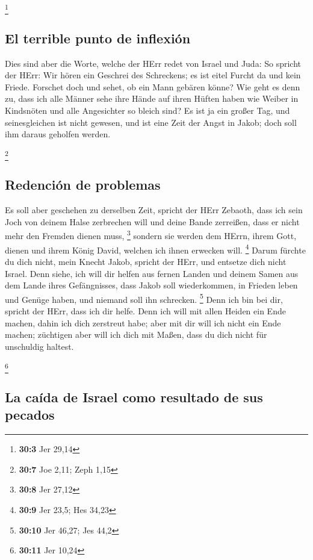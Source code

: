 \footnote{\textbf{30:3} Jer 29,14}

\hypertarget{el-terrible-punto-de-inflexiuxf3n}{%
\subsection{El terrible punto de
inflexión}\label{el-terrible-punto-de-inflexiuxf3n}}

 Dies sind aber die Worte, welche der HErr redet von
Israel und Juda:  So spricht der HErr: Wir hören ein
Geschrei des Schreckens; es ist eitel Furcht da und kein Friede.
 Forschet doch und sehet, ob ein Mann gebären könne? Wie
geht es denn zu, dass ich alle Männer sehe ihre Hände auf ihren Hüften
haben wie Weiber in Kindsnöten und alle Angesichter so bleich sind?
 Es ist ja ein großer Tag, und seinesgleichen ist nicht
gewesen, und ist eine Zeit der Angst in Jakob; doch soll ihm daraus
geholfen werden.

\footnote{\textbf{30:7} Joe 2,11; Zeph 1,15}

\hypertarget{redenciuxf3n-de-problemas}{%
\subsection{Redención de problemas}\label{redenciuxf3n-de-problemas}}

 Es soll aber geschehen zu derselben Zeit, spricht der
HErr Zebaoth, dass ich sein Joch von deinem Halse zerbrechen will und
deine Bande zerreißen, dass er nicht mehr den Fremden dienen muss,
\footnote{\textbf{30:8} Jer 27,12}  sondern sie werden dem
HErrn, ihrem Gott, dienen und ihrem König David, welchen ich ihnen
erwecken will. \footnote{\textbf{30:9} Jer 23,5; Hes 34,23}
 Darum fürchte du dich nicht, mein Knecht Jakob, spricht
der HErr, und entsetze dich nicht Israel. Denn siehe, ich will dir
helfen aus fernen Landen und deinem Samen aus dem Lande ihres
Gefängnisses, dass Jakob soll wiederkommen, in Frieden leben und Genüge
haben, und niemand soll ihn schrecken. \footnote{\textbf{30:10} Jer
  46,27; Jes 44,2}  Denn ich bin bei dir, spricht der
HErr, dass ich dir helfe. Denn ich will mit allen Heiden ein Ende
machen, dahin ich dich zerstreut habe; aber mit dir will ich nicht ein
Ende machen; züchtigen aber will ich dich mit Maßen, dass du dich nicht
für unschuldig haltest.

\footnote{\textbf{30:11} Jer 10,24}

\hypertarget{la-cauxedda-de-israel-como-resultado-de-sus-pecados}{%
\subsection{La caída de Israel como resultado de sus
pecados}\label{la-cauxedda-de-israel-como-resultado-de-sus-pecados}}

